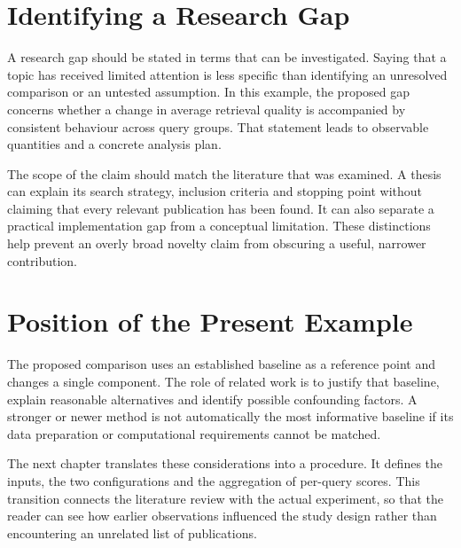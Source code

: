\section{Identifying a Research Gap}
A research gap should be stated in terms that can be investigated. Saying that
a topic has received limited attention is less specific than identifying an
unresolved comparison or an untested assumption. In this example, the proposed
gap concerns whether a change in average retrieval quality is accompanied by
consistent behaviour across query groups. That statement leads to observable
quantities and a concrete analysis plan.

The scope of the claim should match the literature that was examined. A thesis
can explain its search strategy, inclusion criteria and stopping point without
claiming that every relevant publication has been found. It can also separate
a practical implementation gap from a conceptual limitation. These distinctions
help prevent an overly broad novelty claim from obscuring a useful, narrower
contribution.

\section{Position of the Present Example}
The proposed comparison uses an established baseline as a reference point and
changes a single component. The role of related work is to justify that baseline,
explain reasonable alternatives and identify possible confounding factors.
A stronger or newer method is not automatically the most informative baseline
if its data preparation or computational requirements cannot be matched.

The next chapter translates these considerations into a procedure. It defines
the inputs, the two configurations and the aggregation of per-query scores.
This transition connects the literature review with the actual experiment,
so that the reader can see how earlier observations influenced the study
design rather than encountering an unrelated list of publications.
